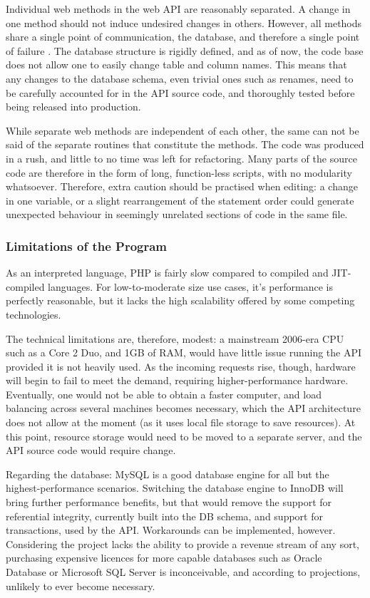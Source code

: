         Individual web methods in the web API are reasonably separated. A change in one method should not induce undesired changes in others. However, all methods share a single point of communication, the database, and therefore a single point of failure . The database structure is rigidly defined, and as of now, the code base does not allow one to easily change table and column names. This means that any changes to the database schema, even trivial ones such as renames, need to be carefully accounted for in the API source code, and thoroughly tested before being released into production.
    
        While separate web methods are independent of each other, the same can not be said of the separate routines that constitute the methods. The code was produced in a rush, and little to no time was left for refactoring. Many parts of the source code are therefore in the form of long, function-less scripts, with no modularity whatsoever. Therefore, extra caution should be practised when editing: a change in one variable, or a slight rearrangement of the statement order could generate unexpected behaviour in seemingly unrelated sections of code in the same file.

    \subsubsection{Limitations of the Program}
        As an interpreted language, PHP is fairly slow compared to compiled and JIT-compiled languages. For low-to-moderate size use cases, it's performance is perfectly reasonable, but it lacks the high scalability offered by some competing technologies. 
    
        The technical limitations are, therefore, modest: a mainstream 2006-era CPU such as a Core 2 Duo, and 1GB of RAM, would have little issue running the API provided it is not heavily used. As the incoming requests rise, though, hardware will begin to fail to meet the demand, requiring higher-performance hardware. Eventually, one would not be able to obtain a faster computer, and load balancing across several machines becomes necessary, which the API architecture does not allow at the moment (as it uses local file storage to save resources). At this point, resource storage would need to be moved to a separate server, and the API source code would require change. 
    
        Regarding the database: MySQL is a good database engine for all but the highest-performance scenarios. Switching the database engine to InnoDB will bring further performance benefits, but that would remove the support for referential integrity, currently built into the DB schema, and support for transactions, used by the API. Workarounds can be implemented, however. Considering the project lacks the ability to provide a revenue stream of any sort, purchasing expensive licences for more capable databases such as Oracle Database or Microsoft SQL Server is inconceivable, and according to projections, unlikely to ever become necessary.

